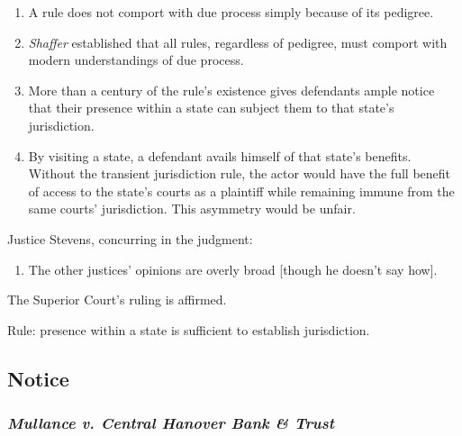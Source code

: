 \begin{enumerate}
\item
  A rule does not comport with due process simply because of its
  pedigree.
\item
  \emph{Shaffer} established that all rules, regardless of pedigree,
  must comport with modern understandings of due process.
\item
  More than a century of the rule's existence gives defendants ample
  notice that their presence within a state can subject them to that
  state's jurisdiction.
\item
  By visiting a state, a defendant avails himself of that state's
  benefits. Without the transient jurisdiction rule, the actor would
  have the full benefit of access to the state's courts as a plaintiff
  while remaining immune from the same courts' jurisdiction. This
  asymmetry would be unfair.
\end{enumerate}

Justice Stevens, concurring in the judgment:

\begin{enumerate}
\item
  The other justices' opinions are overly broad {[}though he doesn't say
  how{]}.
\end{enumerate}

The Superior Court's ruling is affirmed.

Rule: presence within a state is sufficient to establish jurisdiction.

\subsection{Notice}

\subsubsection{\emph{Mullance v. Central Hanover Bank \& Trust}}

